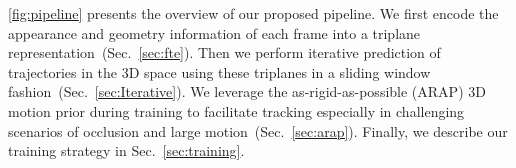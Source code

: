 \cref{fig:pipeline} presents the overview of our proposed pipeline. 
We first encode the appearance and geometry information of each frame into a triplane representation~(Sec.~\ref{sec:fte}).
Then we perform iterative prediction of trajectories in the 3D space using these triplanes in a sliding window fashion~(Sec.~\ref{sec:Iterative}). We leverage the as-rigid-as-possible (ARAP) 3D motion prior during training to facilitate tracking especially in challenging scenarios of occlusion and large motion~(Sec.~\ref{sec:arap}). 
Finally, we describe our training strategy in Sec.~\ref{sec:training}.

    
    
